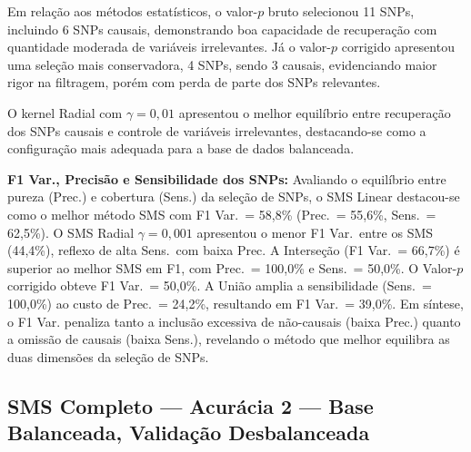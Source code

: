 \documentclass[12pt,a4paper]{article}
\newcommand{\novo}[1]{\textcolor{corNova}{#1}}
\begin{document}
Em relação aos métodos estatísticos, o valor-$p$ bruto selecionou 11 SNPs, incluindo 6 SNPs causais, demonstrando boa capacidade de recuperação com quantidade moderada de variáveis irrelevantes. Já o valor-$p$ corrigido apresentou uma seleção mais conservadora, 4 SNPs, sendo 3 causais, evidenciando maior rigor na filtragem, porém com perda de parte dos SNPs relevantes.

O kernel Radial com $\gamma = 0{,}01$ apresentou o melhor equilíbrio entre recuperação dos SNPs causais e controle de variáveis irrelevantes, destacando-se como a configuração mais adequada para a base de dados balanceada.


\novo{\textbf{F1 Var., Precisão e Sensibilidade dos SNPs:} Avaliando o equilíbrio entre pureza (Prec.) e cobertura (Sens.) da seleção de SNPs, o SMS Linear destacou-se como o melhor método SMS com F1 Var.\ = 58,8\% (Prec.\ = 55,6\%, Sens.\ = 62,5\%). O SMS Radial $\gamma=0{,}001$ apresentou o menor F1 Var.\ entre os SMS (44,4\%), reflexo de alta Sens.\ com baixa Prec. A Interseção (F1 Var.\ = 66,7\%) é superior ao melhor SMS em F1, com Prec.\ = 100,0\% e Sens.\ = 50,0\%. O Valor-$p$ corrigido obteve F1 Var.\ = 50,0\%. A União amplia a sensibilidade (Sens.\ = 100,0\%) ao custo de Prec.\ = 24,2\%, resultando em F1 Var.\ = 39,0\%. Em síntese, o F1 Var. penaliza tanto a inclusão excessiva de não-causais (baixa Prec.) quanto a omissão de causais (baixa Sens.), revelando o método que melhor equilibra as duas dimensões da seleção de SNPs.}
\subsection{SMS Completo --- Acurácia 2 --- Base Balanceada, Validação Desbalanceada}
\end{document}
